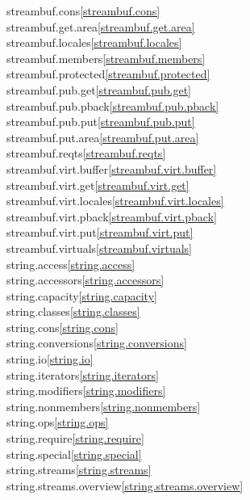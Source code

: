 \begin{multicols}{2}
streambuf.cons\quad\ref{streambuf.cons}\\
streambuf.get.area\quad\ref{streambuf.get.area}\\
streambuf.locales\quad\ref{streambuf.locales}\\
streambuf.members\quad\ref{streambuf.members}\\
streambuf.protected\quad\ref{streambuf.protected}\\
streambuf.pub.get\quad\ref{streambuf.pub.get}\\
streambuf.pub.pback\quad\ref{streambuf.pub.pback}\\
streambuf.pub.put\quad\ref{streambuf.pub.put}\\
streambuf.put.area\quad\ref{streambuf.put.area}\\
streambuf.reqts\quad\ref{streambuf.reqts}\\
streambuf.virt.buffer\quad\ref{streambuf.virt.buffer}\\
streambuf.virt.get\quad\ref{streambuf.virt.get}\\
streambuf.virt.locales\quad\ref{streambuf.virt.locales}\\
streambuf.virt.pback\quad\ref{streambuf.virt.pback}\\
streambuf.virt.put\quad\ref{streambuf.virt.put}\\
streambuf.virtuals\quad\ref{streambuf.virtuals}\\
string.access\quad\ref{string.access}\\
string.accessors\quad\ref{string.accessors}\\
string.capacity\quad\ref{string.capacity}\\
string.classes\quad\ref{string.classes}\\
string.cons\quad\ref{string.cons}\\
string.conversions\quad\ref{string.conversions}\\
string.io\quad\ref{string.io}\\
string.iterators\quad\ref{string.iterators}\\
string.modifiers\quad\ref{string.modifiers}\\
string.nonmembers\quad\ref{string.nonmembers}\\
string.ops\quad\ref{string.ops}\\
string.require\quad\ref{string.require}\\
string.special\quad\ref{string.special}\\
string.streams\quad\ref{string.streams}\\
string.streams.overview\quad\ref{string.streams.overview}\\

\end{multicols}
